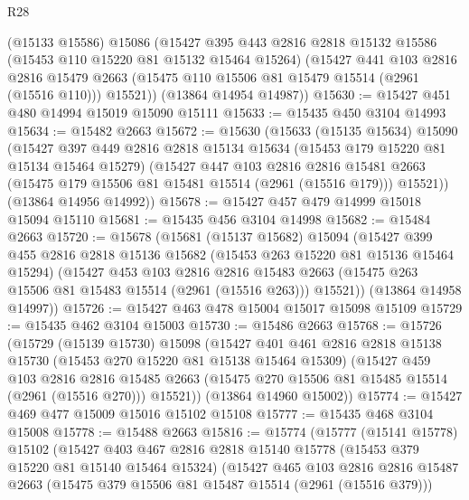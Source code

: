 \begin{lexlean}{R28}
\begin{coremodule}
      (@15133 @15586)
      @15086
      (@15427
        @395
        @443
        @2816
        @2818
        @15132
        @15586
        (@15453 @110 @15220 @81 @15132 @15464 @15264)
        (@15427
          @441
          @103
          @2816
          @2816
          @15479
          @2663
          (@15475 @110 @15506 @81 @15479 @15514 (@2961 (@15516 @110)))
          @15521))
      (@13864 @14954 @14987))
@15630 := @15427 @451 @480 @14994 @15019 @15090 @15111
@15633 := @15435 @450 @3104 @14993
@15634 := @15482 @2663
@15672 := @15630
    (@15633
      (@15135 @15634)
      @15090
      (@15427
        @397
        @449
        @2816
        @2818
        @15134
        @15634
        (@15453 @179 @15220 @81 @15134 @15464 @15279)
        (@15427
          @447
          @103
          @2816
          @2816
          @15481
          @2663
          (@15475 @179 @15506 @81 @15481 @15514 (@2961 (@15516 @179)))
          @15521))
      (@13864 @14956 @14992))
@15678 := @15427 @457 @479 @14999 @15018 @15094 @15110
@15681 := @15435 @456 @3104 @14998
@15682 := @15484 @2663
@15720 := @15678
    (@15681
      (@15137 @15682)
      @15094
      (@15427
        @399
        @455
        @2816
        @2818
        @15136
        @15682
        (@15453 @263 @15220 @81 @15136 @15464 @15294)
        (@15427
          @453
          @103
          @2816
          @2816
          @15483
          @2663
          (@15475 @263 @15506 @81 @15483 @15514 (@2961 (@15516 @263)))
          @15521))
      (@13864 @14958 @14997))
@15726 := @15427 @463 @478 @15004 @15017 @15098 @15109
@15729 := @15435 @462 @3104 @15003
@15730 := @15486 @2663
@15768 := @15726
    (@15729
      (@15139 @15730)
      @15098
      (@15427
        @401
        @461
        @2816
        @2818
        @15138
        @15730
        (@15453 @270 @15220 @81 @15138 @15464 @15309)
        (@15427
          @459
          @103
          @2816
          @2816
          @15485
          @2663
          (@15475 @270 @15506 @81 @15485 @15514 (@2961 (@15516 @270)))
          @15521))
      (@13864 @14960 @15002))
@15774 := @15427 @469 @477 @15009 @15016 @15102 @15108
@15777 := @15435 @468 @3104 @15008
@15778 := @15488 @2663
@15816 := @15774
    (@15777
      (@15141 @15778)
      @15102
      (@15427
        @403
        @467
        @2816
        @2818
        @15140
        @15778
        (@15453 @379 @15220 @81 @15140 @15464 @15324)
        (@15427
          @465
          @103
          @2816
          @2816
          @15487
          @2663
          (@15475 @379 @15506 @81 @15487 @15514 (@2961 (@15516 @379)))

\end{coremodule}
\end{lexlean}
